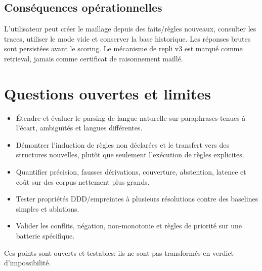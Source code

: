 \documentclass[11pt,a4paper]{book}
\begin{document}
\section{Conséquences opérationnelles}
L'utilisateur peut créer le maillage depuis des faits/règles nouveaux, consulter les traces, utiliser le mode vide et conserver la base historique. Les réponses brutes sont persistées avant le scoring. Le mécanisme de repli v3 est marqué comme retrieval, jamais comme certificat de raisonnement maillé.

\chapter{Questions ouvertes et limites}
\begin{itemize}
\item Étendre et évaluer le parsing de langue naturelle sur paraphrases tenues à l'écart, ambiguïtés et langues différentes.
\item Démontrer l'induction de règles non déclarées et le transfert vers des structures nouvelles, plutôt que seulement l'exécution de règles explicites.
\item Quantifier précision, fausses dérivations, couverture, abstention, latence et coût sur des corpus nettement plus grands.
\item Tester propriétés DDD/empreintes à plusieurs résolutions contre des baselines simples et ablations.
\item Valider les conflits, négation, non-monotonie et règles de priorité sur une batterie spécifique.
\end{itemize}
Ces points sont ouverts et testables; ils ne sont pas transformés en verdict d'impossibilité.
\end{document}
